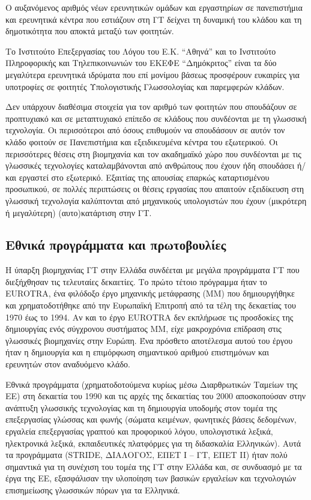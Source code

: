 \documentclass[]{../../metanetpaper}
\begin{document}
\begin{multicols}{2}
Ο αυξανόμενος αριθμός νέων ερευνητικών ομάδων και εργαστηρίων σε πανεπιστήμια και ερευνητικά κέντρα που εστιάζουν στη ΓΤ δείχνει τη δυναμική του κλάδου και τη δημοτικότητα που αποκτά μεταξύ των φοιτητών.

Το Ινστιτούτο Επεξεργασίας του Λόγου του Ε.Κ. “Αθηνά” και το Ινστιτούτο Πληροφορικής και Τηλεπικοινωνιών του ΕΚΕΦΕ “Δημόκριτος” είναι τα δύο μεγαλύτερα ερευνητικά ιδρύματα που επί μονίμου βάσεως προσφέρουν ευκαιρίες για υποτροφίες σε φοιτητές Υπολογιστικής Γλωσσολογίας και παρεμφερών κλάδων.

Δεν υπάρχουν διαθέσιμα στοιχεία για τον αριθμό των φοιτητών που σπουδάζουν σε προπτυχιακό και σε μεταπτυχιακό επίπεδο σε κλάδους που συνδέονται με τη γλωσσική τεχνολογία. Οι περισσότεροι από όσους επιθυμούν να σπουδάσουν σε αυτόν τον κλάδο φοιτούν σε Πανεπιστήμια και εξειδικευμένα κέντρα του εξωτερικού. Οι περισσότερες θέσεις στη βιομηχανία και τον ακαδημαϊκό χώρο που συνδέονται με τις γλωσσικές τεχνολογίες καταλαμβάνονται από ανθρώπους που έχουν ήδη σπουδάσει ή/και εργαστεί στο εξωτερικό. Εξαιτίας της απουσίας επαρκώς καταρτισμένου προσωπικού, σε πολλές περιπτώσεις οι θέσεις εργασίας που απαιτούν εξειδίκευση στη γλωσσική τεχνολογία καλύπτονται από μηχανικούς υπολογιστών που έχουν (μικρότερη ή μεγαλύτερη) (αυτο)κατάρτιση στην ΓΤ.

\subsection{Εθνικά προγράμματα και πρωτοβουλίες}

Η ύπαρξη βιομηχανίας ΓΤ στην Ελλάδα συνδέεται με μεγάλα προγράμματα ΓΤ που διεξήχθησαν τις τελευταίες δεκαετίες. Το πρώτο τέτοιο πρόγραμμα ήταν το EUROTRA, ένα φιλόδοξο έργο μηχανικής μετάφρασης (ΜΜ) που δημιουργήθηκε και χρηματοδοτήθηκε από την Ευρωπαϊκή Επιτροπή από τα τέλη της δεκαετίας του 1970 έως το 1994. Αν και το έργο EUROTRA δεν εκπλήρωσε τις προσδοκίες της δημιουργίας ενός σύγχρονου συστήματος MΜ,  είχε μακροχρόνια επίδραση στις γλωσσικές βιομηχανίες στην Ευρώπη. Ένα πρόσθετο αποτέλεσμα αυτού του έργου ήταν η δημιουργία και η επιμόρφωση σημαντικού αριθμού επιστημόνων και ερευνητών στον αναδυόμενο κλάδο. 

Εθνικά προγράμματα (χρηματοδοτούμενα κυρίως μέσω Διαρθρωτικών Ταμείων της ΕΕ) στη δεκαετία του 1990 και τις αρχές της δεκαετίας του 2000 αποσκοπούσαν στην ανάπτυξη γλωσσικής τεχνολογίας και τη δημιουργία υποδομής στον τομέα της επεξεργασίας γλώσσας και φωνής (σώματα κειμένων, φωνητικές βάσεις δεδομένων, εργαλεία επεξεργασίας γραπτού και προφορικού λόγου, υπολογιστικά λεξικά, ηλεκτρονικά λεξικά, εκπαιδευτικές πλατφόρμες για τη διδασκαλία Ελληνικών). Αυτά τα προγράμματα (STRIDE, ΔΙΑΛΟΓΟΣ, ΕΠΕΤ I – ΓΤ, ΕΠΕΤ II) ήταν πολύ σημαντικά για  τη συνέχιση του τομέα της ΓΤ στην Ελλάδα και, σε συνδυασμό με τα έργα της ΕΕ, εξασφάλισαν την υλοποίηση των βασικών εργαλείων και τεχνολογιών επισημείωσης γλωσσικών πόρων για τα Ελληνικά.


\end{multicols}
\end{document}
